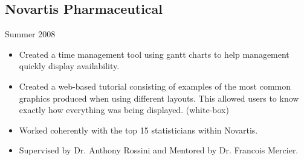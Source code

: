 \documentclass[oneside]{article}
\begin{document}
%
%



\subsection{Novartis Pharmaceutical} Summer 2008
\begin{itemize}
  \item Created a time management tool using gantt charts to help management quickly display availability.
  \item Created a web-based tutorial consisting of examples of the most common graphics produced when using different layouts.  This allowed users to know exactly how everything was being displayed.  (white-box)
  \item Worked coherently with the top 15 statisticians within Novartis.
  \item Supervised by Dr. Anthony Rossini and Mentored by Dr. Francois Mercier.
\end{itemize}

%
%
\end{document}
